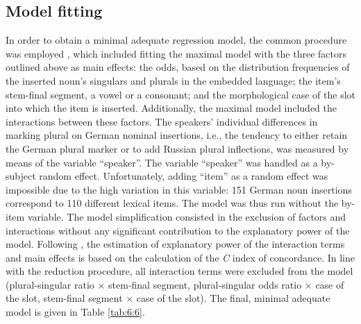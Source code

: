 \subsection{Model fitting}

In order to obtain a minimal adequate regression model, the common procedure was employed \citep{baayen-analyzing,szmrecsanyi-2013}, which included fitting the maximal model with the three factors outlined above as main effects: the odds, based on the distribution frequencies of the inserted noun's singulars and plurals in the embedded language; the item’s stem-final segment, a vowel or a consonant; and the morphological case of the slot into which the item is inserted. Additionally, the maximal model included the interactions between these factors. The speakers' individual differences in marking plural on German nominal insertions, i.e., the tendency to either retain the German plural marker or to add Russian plural inflections, was measured by means of the variable “speaker”. The variable “speaker” was handled as a by-subject random effect. Unfortunately, adding “item” as a random effect was impossible due to the high variation in this variable: 151 German noun insertions correspond to 110 different lexical items. The model was thus run without the by-item variable. The model simplification consisted in the exclusion of factors and interactions without any significant contribution to the explanatory power of the model. Following \citet[281]{baayen-analyzing}, the estimation of explanatory power of the interaction terms and main effects is based on the calculation of the \textit{C} index of concordance. In line with the reduction procedure, all interaction terms were excluded from the model (plural-singular ratio $\times$ stem-final segment, plural-singular odds ratio $\times$ case of the slot, stem-final segment $\times$ case of the slot). The final, minimal adequate model is given in Table \ref{tab:6:6}.

